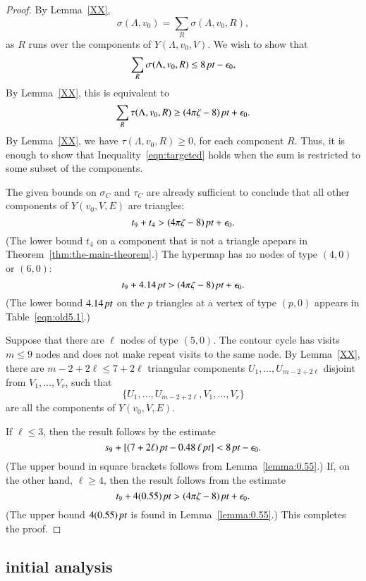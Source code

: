 \begin{proof}  
By Lemma~\ref{XX},
  $$
  \sigma(\Lambda,v_0) = \sum_{R}\sigma(\Lambda,v_0,R),
  $$
as $R$ runs over the components of $Y(\Lambda,v_0,V)$.
We wish to show that
  $$
  \sum_{R}\sigma(\Lambda,v_0,R)\le 8\,\hbox{\it pt} -\epsilon_0,
  $$
By Lemma~\ref{XX}, this is equivalent to
  \begin{equation}
  \sum_{R} \tau(\Lambda,v_0,R)\ge (4\pi\zeta-8)\,\hbox{\it pt}+\epsilon_0.
  \label{eqn:targeted}
  \end{equation}
By Lemma~\ref{XX}, we have $\tau(\Lambda,v_0,R)\ge0$, for
each component $R$.  Thus, it is enough to show that
Inequality~\ref{eqn:targeted} holds when the sum is restricted
to some subset of the components.

The given bounds on $\sigma_C$ and $\tau_C$ are
already sufficient to conclude that all other components of
$Y(v_0,V,E)$ are triangles:
   $$
   t_9 + t_4 > (4\pi\zeta -8)\,\hbox{\it pt} + \epsilon_0.
   $$
(The lower bound $t_4$ on a component that is not a triangle apepars
in Theorem~\ref{thm:the-main-theorem}.)
The hypermap has no nodes of type $(4,0)$ or $(6,0)$:
$$
   t_9 + 4.14\,\hbox{\it pt} > (4\pi\zeta-8)\,\hbox{\it pt} + \epsilon_0.
$$
(The lower bound $4.14\,\hbox{\it pt}$ on the $p$ triangles at a vertex
of type $(p,0)$ appears in Table~\ref{eqn:old5.1}.)

Suppose that there are $\ell$ nodes of type $(5,0)$.  The
contour cycle has visits  $m\le 9$ nodes and does
not make repeat visits to the same node.  By Lemma~\ref{XX},
there are $m-2 + 2\ell\le 7+2\ell$ 
triangular components $U_1,\ldots,U_{m-2+2\ell}$
disjoint from $V_1,\ldots,V_r$, such that
   $$
   \{U_1,\ldots,U_{m-2+2\ell},V_1,\ldots,V_r\}
   $$
are all the components of $Y(v_0,V,E)$.

If $\ell\le 3$, then the result follows by the estimate
   $$
   s_9 + [(7+2\ell)\,\hbox{\it pt} - 0.48\,\ell\,\hbox{\it pt}] < 8\,\hbox{\it pt} - \epsilon_0.
   $$
(The upper bound in square brackets follows from Lemma~\ref{lemma:0.55}.)
If, on the other hand, $\ell\ge 4$, then the result follows from
the estimate
   $$
   t_9 + 4 (0.55)\,\hbox{\it pt} > (4\pi\zeta -8)\,\hbox{\it pt} + \epsilon_0.
   $$
(The upper bound $4(0.55)\,\hbox{\it pt}$ is found in Lemma~\ref{lemma:0.55}.)
This completes the proof.
\end{proof}

\subsection{initial analysis}

